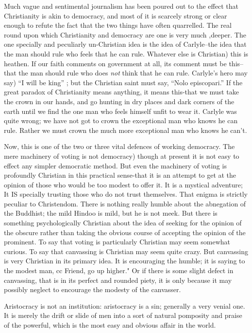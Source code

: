 \documentclass{book}
\begin{document}
Much vague and sentimental journalism has been poured out to the effect that Christianity is akin to democracy, and most of it is scarcely strong or clear enough to refute the fact that the two things have often quarrelled. The real round upon which Christianity and democracy are one is very much ,deeper. The one specially and peculiarly un-Christian idea is the idea of Carlyle–the idea that the man should rule who feels that he can rule. Whatever else is Christian) this is heathen. If our faith comments on government at all, its comment must be this–that the man should rule who does \emph{not} think that he can rule. Carlyle’s hero may say) “I will be king” ; but the Christian saint must say, “Nolo episcopari.” If the great paradox of Christianity means anything, it means this-that we must take the crown in our hands, and go hunting in dry places and dark corners of the earth until we find the one man who feels himself unfit to wear it. Carlyle was quite wrong; we have not got to crown the exceptional man who knows he can rule. Rather we must crown the much more exceptional man who knows he can’t.

Now, this is one of the two or three vital defences of working democracy. The mere machinery of voting is not democracy) though at present it is not easy to effect any simpler democratic method. But even the machinery of voting is profoundly Christian in this practical sense-that it is an attempt to get at the opinion of those who would be too modest to offer it. It is a mystical adventure; It IS specially trusting those who do not trust themselves. That enigma is strictly peculiar to Christendom. There is nothing really humble about the abnegation of the Buddhist; the mild Hindoo is mild, but he is not meek. But there is something psychologically Christian about the idea of seeking for the opinion of the obscure rather than taking the obvious course of accepting the opinion of the prominent. To say that voting is particularly Christian may seem somewhat curious. To say that canvassing is Christian may seem quite crazy. But canvassing is very Christian in its primary idea. It is encouraging the humble; it is saying to the modest man, cc Friend, go up higher." Or if there is some slight defect in canvassing, that is in its perfect and rounded piety, it is only because it may possibly neglect to encourage the modesty of the canvasser.

Aristocracy is not an institution: aristocracy is a sin; generally a very venial one. It is merely the drift or slide of men into a sort of natural pomposity and praise of the powerful, which is the most easy and obvious affair in the world.
\end{document}
